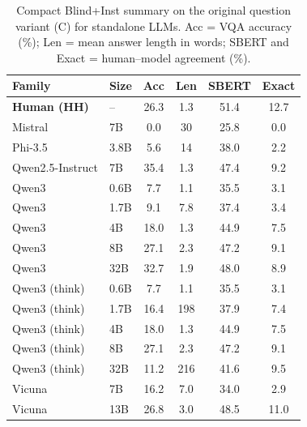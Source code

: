 \begin{table}[t]
\scriptsize
\centering
\setlength{\tabcolsep}{3pt}
\begin{tabular}{ll|cccc}
\toprule
\textbf{Family} & \textbf{Size} & \textbf{Acc} & \textbf{Len} & \textbf{SBERT} & \textbf{Exact} \\
\midrule
\textbf{Human (HH)} & -- & 26.3 & 1.3 & 51.4 & 12.7 \\
\midrule
Mistral & 7B & 0.0 & 30 & 25.8 & 0.0 \\
Phi-3.5 & 3.8B & 5.6 & 14 & 38.0 & 2.2 \\
Qwen2.5-Instruct & 7B & 35.4 & 1.3 & 47.4 & 9.2 \\
Qwen3 & 0.6B & 7.7 & 1.1 & 35.5 & 3.1 \\
Qwen3 & 1.7B & 9.1 & 7.8 & 37.4 & 3.4 \\
Qwen3 & 4B & 18.0 & 1.3 & 44.9 & 7.5 \\
Qwen3 & 8B & 27.1 & 2.3 & 47.2 & 9.1 \\
Qwen3 & 32B & 32.7 & 1.9 & 48.0 & 8.9 \\
Qwen3 (think) & 0.6B & 7.7 & 1.1 & 35.5 & 3.1 \\
Qwen3 (think) & 1.7B & 16.4 & 198 & 37.9 & 7.4 \\
Qwen3 (think) & 4B & 18.0 & 1.3 & 44.9 & 7.5 \\
Qwen3 (think) & 8B & 27.1 & 2.3 & 47.2 & 9.1 \\
Qwen3 (think) & 32B & 11.2 & 216 & 41.6 & 9.5 \\
Vicuna & 7B & 16.2 & 7.0 & 34.0 & 2.9 \\
Vicuna & 13B & 26.8 & 3.0 & 48.5 & 11.0 \\
\bottomrule
\end{tabular}
\caption{\small Compact Blind+Inst summary on the original question variant (C) for standalone LLMs. Acc = VQA accuracy (\%); Len = mean answer length in words; SBERT and Exact = human--model agreement (\%).}
\label{tab:summary_llm_vc}
\end{table}
